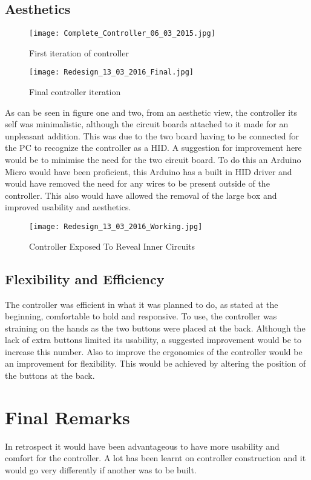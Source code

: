 \documentclass{scrartcl}
\begin{document}
\subsection{Aesthetics}
\begin{figure}[h!]
	\centering
	\texttt{[image: Complete\_Controller\_06\_03\_2015.jpg]}
	\caption{First iteration of controller}
	\label{Fig1}
\end{figure}
\begin{figure}[h]
	\centering
	\texttt{[image: Redesign\_13\_03\_2016\_Final.jpg]}
	\caption{Final controller iteration}
	\label{Fig2}
\end{figure}
As can be seen in figure one and two, from an aesthetic view, the controller its self was minimalistic, although the circuit boards attached to it made for an unpleasant addition. This was due to the two board having to be connected for the PC to recognize the controller as a HID. A suggestion for improvement here would be to minimise the need for the two circuit board. To do this an Arduino Micro would have been proficient, this Arduino has a built in HID driver and would have removed the need for any wires to be present outside of the controller. This also would have allowed the removal of the large box and improved usability and aesthetics.

\begin{figure}[h]
	\centering
	\texttt{[image: Redesign\_13\_03\_2016\_Working.jpg]}
	\caption{Controller Exposed To Reveal Inner Circuits}
	\label{Fig3}
\end{figure}
\subsection{Flexibility and Efficiency}
The controller was efficient in what it was planned to do, as stated at the beginning, comfortable to hold and responsive. To use, the controller was straining on the hands as the two buttons were placed at the back. Although the lack of extra buttons limited its usability, a suggested improvement would be to increase this number. Also to improve the ergonomics of the controller would be an improvement for flexibility. This would be achieved by altering the position of the buttons at the back.

\section{Final Remarks}
In retrospect it would have been advantageous to have more usability and comfort for the controller. A lot has been learnt on controller construction and it would go very differently if another was to be built.



\end{document}

